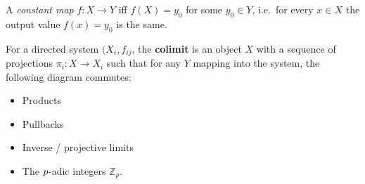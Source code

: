 
\begin{definition}

A \emph{constant map} \(f: X\to Y\) iff \(f(X) = y_{0}\) for some
\(y_{0}\in Y\), i.e.~for every \(x\in X\) the output value
\(f(x) = y_{0}\) is the same.

\end{definition}

\begin{definition}[Colimit]

For a directed system \((X_{i}, f_{ij}\), the \textbf{colimit} is an
object \(X\) with a sequence of projections \(\pi_{i}:X\to X_{i}\) such
that for any \(Y\) mapping into the system, the following diagram
commutes:

\begin{center}
\end{center}

\end{definition}

\begin{example}[of colimits]

\envlist

\begin{itemize}
\tightlist
\item
  Products
\item
  Pullbacks
\item
  Inverse / projective limits
\item
  The \(p{\hbox{-}}\)adic integers \({\mathbb{Z}}_{p}\).
\end{itemize}

\end{example}

